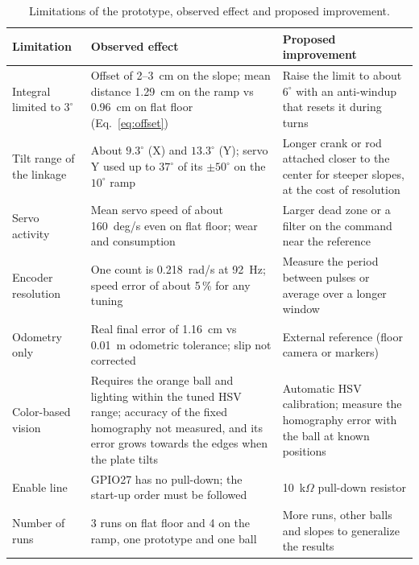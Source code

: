 \documentclass[11pt,letterpaper]{article}
\begin{document}
\begin{table}[H]
\centering
\caption{Limitations of the prototype, observed effect and proposed improvement.}
\label{tab:limitations}
\small
\begin{tabularx}{\textwidth}{@{}L{3.0cm}YY@{}}
\toprule
\textbf{Limitation} & \textbf{Observed effect} & \textbf{Proposed improvement} \\
\midrule
Integral limited to $3^\circ$ & Offset of 2--3~cm on the slope; mean distance 1.29~cm on the ramp vs 0.96~cm on flat floor (Eq.~\eqref{eq:offset}) & Raise the limit to about $6^\circ$ with an anti-windup that resets it during turns \\
Tilt range of the linkage & About $9.3^\circ$ (X) and $13.3^\circ$ (Y); servo Y used up to $37^\circ$ of its $\pm50^\circ$ on the $10^\circ$ ramp & Longer crank or rod attached closer to the center for steeper slopes, at the cost of resolution \\
Servo activity & Mean servo speed of about 160~deg/s even on flat floor; wear and consumption & Larger dead zone or a filter on the command near the reference \\
Encoder resolution & One count is 0.218~rad/s at 92~Hz; speed error of about 5\,\% for any tuning & Measure the period between pulses or average over a longer window \\
Odometry only & Real final error of 1.16~cm vs 0.01~m odometric tolerance; slip not corrected & External reference (floor camera or markers) \\
Color-based vision & Requires the orange ball and lighting within the tuned HSV range; accuracy of the fixed homography not measured, and its error grows towards the edges when the plate tilts & Automatic HSV calibration; measure the homography error with the ball at known positions \\
Enable line & GPIO27 has no pull-down; the start-up order must be followed & 10~k$\Omega$ pull-down resistor \\
Number of runs & 3 runs on flat floor and 4 on the ramp, one prototype and one ball & More runs, other balls and slopes to generalize the results \\
\bottomrule
\end{tabularx}
\end{table}

\end{document}
